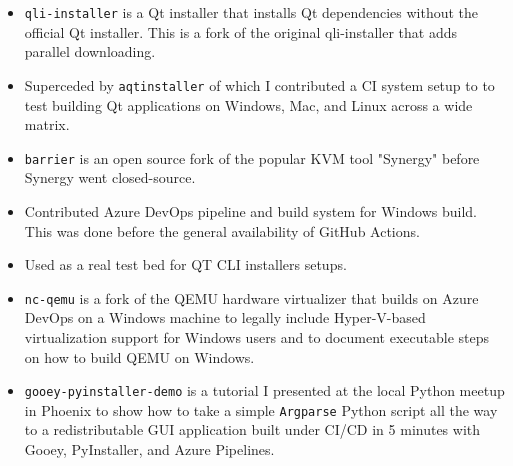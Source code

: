 \documentclass[10pt,letter,ragged2e]{altacv}
\begin{document}
\begin{paracol}{2}
\divider


\begin{itemize}
\item \texttt{qli-installer} is a Qt installer that installs Qt dependencies without the official Qt installer. This is a fork of the original qli-installer that adds parallel downloading.
\item Superceded by \texttt{aqtinstaller} of which I contributed a CI system setup to to test building Qt applications on Windows, Mac, and Linux across a wide matrix.
\end{itemize}

\divider


\begin{itemize}
\item \texttt{barrier} is an open source fork of the popular KVM tool "Synergy" before Synergy went closed-source.
\item Contributed Azure DevOps pipeline and build system for Windows build. This was done before the general availability of GitHub Actions.
\item Used as a real test bed for QT CLI installers setups.
\end{itemize}

\divider


\begin{itemize}
\item \texttt{nc-qemu} is a fork of the QEMU hardware virtualizer that builds on Azure DevOps on a Windows machine to legally include Hyper-V-based virtualization support for Windows users and to document executable steps on how to build QEMU on Windows. 
\end{itemize}

\divider


\begin{itemize}
\item \texttt{gooey-pyinstaller-demo} is a tutorial I presented at the local Python meetup in Phoenix to show how to take a simple \texttt{Argparse} Python script all the way to a redistributable GUI application built under CI/CD in 5 minutes with Gooey, PyInstaller, and Azure Pipelines. 
\end{itemize}




\end{paracol}
\end{document}
